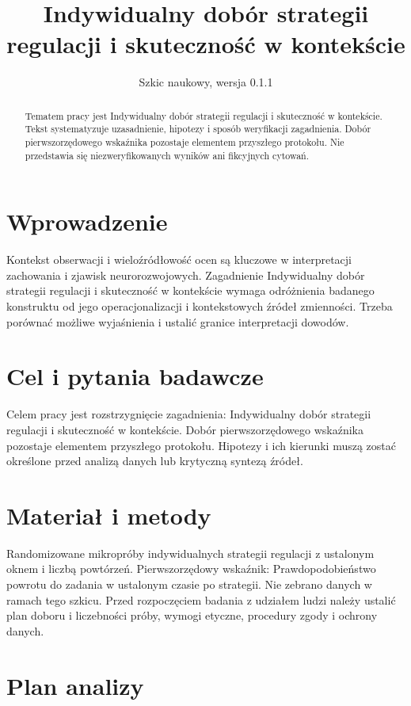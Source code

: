 \documentclass[11pt,a4paper]{article}
\title{Indywidualny dobór strategii regulacji i skuteczność w kontekście}
\author{}
\date{Szkic naukowy, wersja 0.1.1}
\begin{document}
\maketitle

\begin{abstract}

Tematem pracy jest Indywidualny dobór strategii regulacji i skuteczność w kontekście. Tekst systematyzuje uzasadnienie, hipotezy i sposób weryfikacji zagadnienia. Dobór pierwszorzędowego wskaźnika pozostaje elementem przyszłego protokołu. Nie przedstawia się niezweryfikowanych wyników ani fikcyjnych cytowań.

\end{abstract}

\section{Wprowadzenie}

Kontekst obserwacji i wieloźródłowość ocen są kluczowe w interpretacji zachowania i zjawisk neurorozwojowych. Zagadnienie Indywidualny dobór strategii regulacji i skuteczność w kontekście wymaga odróżnienia badanego konstruktu od jego operacjonalizacji i kontekstowych źródeł zmienności. Trzeba porównać możliwe wyjaśnienia i ustalić granice interpretacji dowodów.

\section{Cel i pytania badawcze}

Celem pracy jest rozstrzygnięcie zagadnienia: Indywidualny dobór strategii regulacji i skuteczność w kontekście. Dobór pierwszorzędowego wskaźnika pozostaje elementem przyszłego protokołu. Hipotezy i ich kierunki muszą zostać określone przed analizą danych lub krytyczną syntezą źródeł.

\section{Materiał i metody}

Randomizowane mikropróby indywidualnych strategii regulacji z ustalonym oknem i liczbą powtórzeń. Pierwszorzędowy wskaźnik: Prawdopodobieństwo powrotu do zadania w ustalonym czasie po strategii. Nie zebrano danych w ramach tego szkicu. Przed rozpoczęciem badania z udziałem ludzi należy ustalić plan doboru i liczebności próby, wymogi etyczne, procedury zgody i ochrony danych.

\section{Plan analizy}
\end{document}
